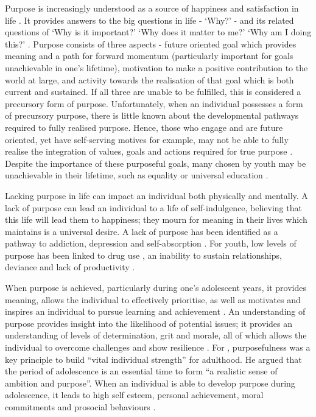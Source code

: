 Purpose is increasingly understood as a source of happiness and satisfaction in life \citep{Damon2003}. It provides answers to the big questions in life - `Why?' - and its related questions of `Why is it important?' `Why does it matter to me?' `Why am I doing this?' \citep{Damon2003}. Purpose consists of three aspects - future oriented goal which provides meaning and a path for forward momentum (particularly important for goals unachievable in one's lifetime), motivation to make a positive contribution to the world at large, and activity towards the realisation of that goal which is both current and sustained. If all three are unable to be fulfilled, this is considered a precursory form of purpose. Unfortunately, when an individual possesses a form of precursory purpose, there is little known about the developmental pathways required to fully realised purpose. Hence, those who engage and are future oriented, yet have self-serving motives for example, may not be able to fully realise the integration of values, goals and actions required for true purpose \citep{Malin2015}. Despite the importance of these purposeful goals, many chosen by youth may be unachievable in their lifetime, such as equality or universal education \citep{Damon2003}. 

Lacking purpose in life can impact an individual both physically and mentally. A lack of purpose can lead an individual to a life of self-indulgence, believing that this life will lead them to happiness; they mourn for meaning in their lives which \citet{Damon2003} maintains is a universal desire. A lack of purpose has been identified as a pathway to addiction, depression and self-absorption \citep{Damon2003}. For youth, low levels of purpose has been linked to drug use \citep{Padelford1974}, an inability to sustain relationships, deviance and lack of productivity \citep{Damon2003}. 


When purpose is achieved, particularly during one's adolescent years, it provides meaning, allows the individual to effectively prioritise, as well as motivates and inspires an individual to pursue learning and achievement \citep{Damon2003}. An understanding of purpose provides insight into the likelihood of potential issues; it provides an understanding of levels of determination, grit and morale, all of which allows the individual to overcome challenges and show resilience \citep{Damon2003}. For \citet[][p141]{Erikson1968}, purposefulness was a key principle to build “vital individual strength” for adulthood. He argued that the period of adolescence is an essential time to form “a realistic sense of ambition and purpose”. When an individual is able to develop purpose during adolescence, it leads to high self esteem, personal achievement, moral commitments and prosocial behaviours \citep{Damon2003}. 


